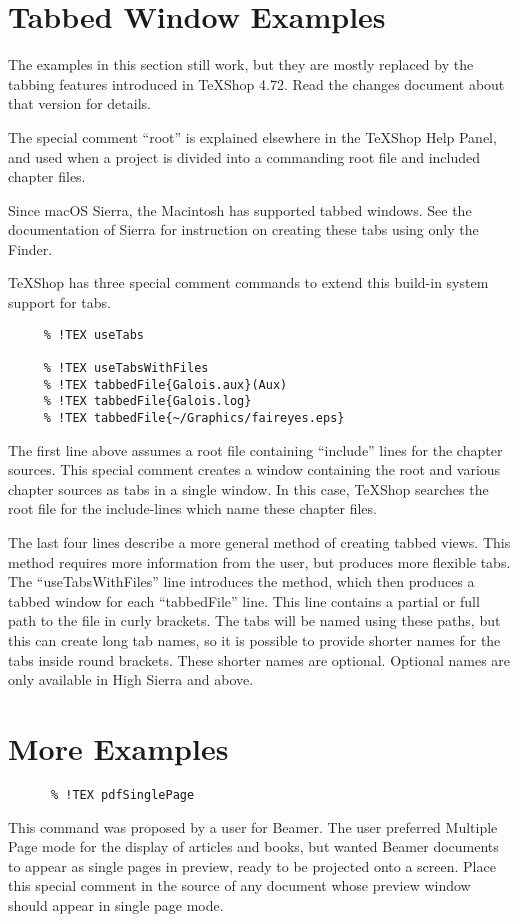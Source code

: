 \documentclass[11pt, oneside]{article}   	%
\begin{document}
 \section{Tabbed Window Examples}
 
 The examples in this section still work, but they are mostly replaced by the tabbing features introduced in TeXShop 4.72. Read the changes document about that version for details.
  
 The special comment ``root'' is explained elsewhere in the TeXShop Help Panel, and used when a project is divided into a commanding root file and included chapter files. 
 
 Since macOS Sierra, the Macintosh has supported tabbed windows. See the documentation of Sierra for  instruction on creating these tabs using only the Finder. 
  
 TeXShop has three special comment commands to extend this build-in system support for tabs. 
 
 \begin{verbatim}
     % !TEX useTabs
	
     % !TEX useTabsWithFiles
     % !TEX tabbedFile{Galois.aux}(Aux)
     % !TEX tabbedFile{Galois.log}
     % !TEX tabbedFile{~/Graphics/faireyes.eps}
 \end{verbatim}
 The first line above assumes a root file containing ``include'' lines for the chapter sources. This special comment creates a window containing the root and various chapter sources as tabs in a single window.
 In this case, TeXShop searches the root file for the include-lines which name these chapter files.
 
 The last four lines describe a more general method of creating tabbed views. This method requires more
 information from the user, but produces more flexible tabs. The ``useTabsWithFiles'' line introduces the method, which then produces a tabbed window for each ``tabbedFile'' line. This line contains a partial or full path to the file in curly brackets. The tabs will be named using these paths, but this can create long tab names, so it is possible to provide  shorter names for the tabs inside round brackets. These
 shorter names are optional. Optional names are only available in High Sierra and above.
 
 \section{More Examples}
 \begin{verbatim}
      % !TEX pdfSinglePage
 \end{verbatim}
 This command was proposed by a user for  Beamer. The user preferred Multiple Page mode for the  display of articles and books, but wanted Beamer documents to appear as single pages in preview, ready to be projected onto a screen. Place this special comment in the source of any document whose preview window should appear in single page mode.
 
\end{document}

